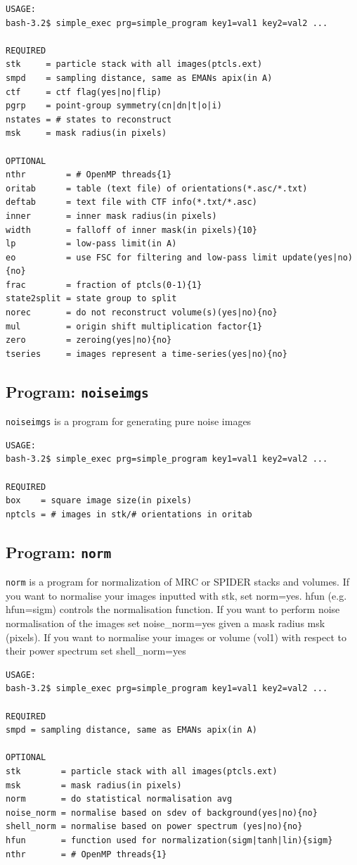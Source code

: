 \documentclass[a4paper,11pt]{article}
\newcommand{\prgname}[1]{\textcolor{NavyBlue}{\texttt{#1}}}
\begin{document}
\begin{verbatim}
USAGE:
bash-3.2$ simple_exec prg=simple_program key1=val1 key2=val2 ...

REQUIRED
stk     = particle stack with all images(ptcls.ext)
smpd    = sampling distance, same as EMANs apix(in A)
ctf     = ctf flag(yes|no|flip)
pgrp    = point-group symmetry(cn|dn|t|o|i)
nstates = # states to reconstruct
msk     = mask radius(in pixels)

OPTIONAL
nthr        = # OpenMP threads{1}
oritab      = table (text file) of orientations(*.asc/*.txt)
deftab      = text file with CTF info(*.txt/*.asc)
inner       = inner mask radius(in pixels)
width       = falloff of inner mask(in pixels){10}
lp          = low-pass limit(in A)
eo          = use FSC for filtering and low-pass limit update(yes|no){no}
frac        = fraction of ptcls(0-1){1}
state2split = state group to split
norec       = do not reconstruct volume(s)(yes|no){no}
mul         = origin shift multiplication factor{1}
zero        = zeroing(yes|no){no}
tseries     = images represent a time-series(yes|no){no}
\end{verbatim}

\subsection{Program: \prgname{noiseimgs}}
\label{noiseimgs}
\prgname{noiseimgs} is a program for generating pure noise images

\begin{verbatim}
USAGE:
bash-3.2$ simple_exec prg=simple_program key1=val1 key2=val2 ...

REQUIRED
box    = square image size(in pixels)
nptcls = # images in stk/# orientations in oritab
\end{verbatim}

\subsection{Program: \prgname{norm}}
\label{norm}
\prgname{norm} is a program for normalization of MRC or SPIDER stacks and volumes. If you want to normalise your images inputted with stk, set norm=yes. hfun (e.g. hfun=sigm) controls the normalisation function. If you want to perform noise normalisation of the images set noise\_norm=yes given a mask radius msk (pixels). If you want to normalise your images or volume (vol1) with respect to their power spectrum set shell\_norm=yes 

\begin{verbatim}
USAGE:
bash-3.2$ simple_exec prg=simple_program key1=val1 key2=val2 ...

REQUIRED
smpd = sampling distance, same as EMANs apix(in A)

OPTIONAL
stk        = particle stack with all images(ptcls.ext)
msk        = mask radius(in pixels)
norm       = do statistical normalisation avg
noise_norm = normalise based on sdev of background(yes|no){no}
shell_norm = normalise based on power spectrum (yes|no){no}
hfun       = function used for normalization(sigm|tanh|lin){sigm}
nthr       = # OpenMP threads{1}
\end{verbatim}
\end{document}
